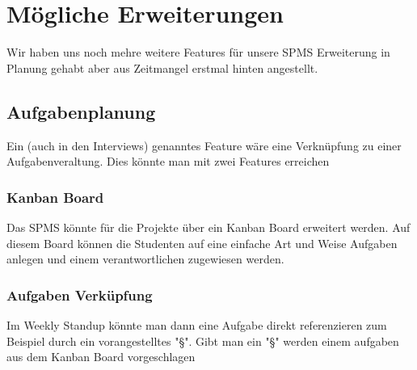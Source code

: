 \chapter{Mögliche Erweiterungen}

Wir haben uns noch mehre weitere Features für unsere \ac{SPMS} Erweiterung in Planung gehabt aber aus Zeitmangel erstmal hinten angestellt.

\section{Aufgabenplanung}

Ein (auch in den Interviews) genanntes Feature wäre eine Verknüpfung zu einer Aufgabenveraltung. Dies könnte man mit zwei Features erreichen

\subsection{Kanban Board}

Das \ac{SPMS} könnte für die Projekte über ein Kanban Board erweitert werden. Auf diesem Board können die Studenten auf eine einfache Art und Weise Aufgaben anlegen und einem verantwortlichen zugewiesen werden.

\subsection{Aufgaben Verküpfung}

Im Weekly Standup könnte man dann eine Aufgabe direkt referenzieren zum Beispiel durch ein vorangestelltes "§". Gibt man ein "§" werden einem aufgaben aus dem Kanban Board vorgeschlagen